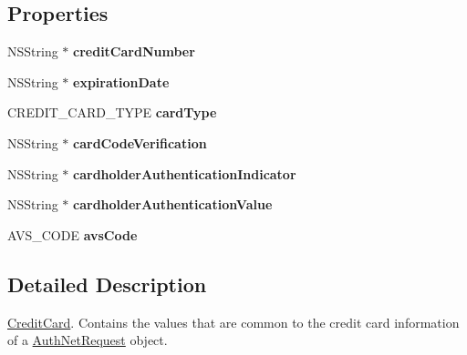 \subsection*{Properties}
\begin{DoxyCompactItemize}
\item 
\hypertarget{interface_credit_card_abec5607fef06181531ed94d432f7401b}{
NSString $\ast$ {\bfseries creditCardNumber}}
\label{interface_credit_card_abec5607fef06181531ed94d432f7401b}

\item 
\hypertarget{interface_credit_card_a6a3e6f9fbf466c256b24166e52d2b29e}{
NSString $\ast$ {\bfseries expirationDate}}
\label{interface_credit_card_a6a3e6f9fbf466c256b24166e52d2b29e}

\item 
\hypertarget{interface_credit_card_a9d678889b44b9ded50d14095f3cd57b5}{
CREDIT\_\-CARD\_\-TYPE {\bfseries cardType}}
\label{interface_credit_card_a9d678889b44b9ded50d14095f3cd57b5}

\item 
\hypertarget{interface_credit_card_aa4114c15cec757c5e578d09ee7c42b37}{
NSString $\ast$ {\bfseries cardCodeVerification}}
\label{interface_credit_card_aa4114c15cec757c5e578d09ee7c42b37}

\item 
\hypertarget{interface_credit_card_a839d88cb3e1ee4d4a16a2e4d04e7ba27}{
NSString $\ast$ {\bfseries cardholderAuthenticationIndicator}}
\label{interface_credit_card_a839d88cb3e1ee4d4a16a2e4d04e7ba27}

\item 
\hypertarget{interface_credit_card_ab556ece7b3a20c5697ae43f7866dbd9c}{
NSString $\ast$ {\bfseries cardholderAuthenticationValue}}
\label{interface_credit_card_ab556ece7b3a20c5697ae43f7866dbd9c}

\item 
\hypertarget{interface_credit_card_a4ce729f4388623ad489daef62a11c414}{
AVS\_\-CODE {\bfseries avsCode}}
\label{interface_credit_card_a4ce729f4388623ad489daef62a11c414}

\end{DoxyCompactItemize}


\subsection{Detailed Description}
\hyperlink{interface_credit_card}{CreditCard}. Contains the values that are common to the credit card information of a \hyperlink{interface_auth_net_request}{AuthNetRequest} object. 

